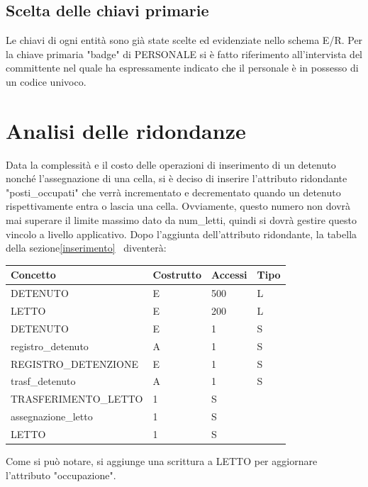 \documentclass[a4paper,12pt]{report}
\begin{document}
\subsection{Scelta delle chiavi primarie}
Le chiavi di ogni entità sono già state scelte ed evidenziate nello schema E/R.
%
Per la chiave primaria "badge" di PERSONALE si è fatto riferimento all'intervista del committente nel quale ha espressamente indicato che il personale è in possesso di un codice univoco.
\section{Analisi delle ridondanze}
Data la complessità e il costo delle operazioni di inserimento di un detenuto nonché l'assegnazione di una cella, si è deciso di inserire l'attributo ridondante "posti\_occupati" che verrà incrementato e decrementato quando un detenuto rispettivamente entra o lascia una cella.
%
Ovviamente, questo numero non dovrà mai superare il limite massimo dato da num\_letti, quindi si dovrà gestire questo vincolo a livello applicativo.
%
Dopo l'aggiunta dell'attributo ridondante, la tabella della sezione\ref{inserimento}~ diventerà: 
\begin{table}[H]
\begin{tabular}{p{5cm} p{2cm} p{1cm} p{1cm}}
\hline
Concetto & Costrutto & Accessi & Tipo \\ \hline
DETENUTO & E & 500 & L \\
LETTO & E & 200 & L \\
DETENUTO & E & 1 & S \\
registro\_detenuto & A & 1 & S \\
REGISTRO\_DETENZIONE & E & 1 & S \\
trasf\_detenuto & A & 1 & S \\
TRASFERIMENTO\_LETTO & 1 & S \\
assegnazione\_letto & 1 & S \\
LETTO & 1 & S \\
\end{tabular}
\end{table}
Come si può notare, si aggiunge una scrittura a LETTO per aggiornare l'attributo "occupazione".
\end{document}
